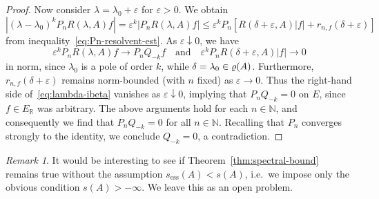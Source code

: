 \documentclass[a4paper, reqno]{amsart}
\numberwithin{equation}{section}
\theoremstyle{plain}
\theoremstyle{definition}
\theoremstyle{remark}
\newtheorem{remark}[theorem]{Remark}
\let\Re\relax
\DeclareMathOperator{\Re}{Re}
\newcommand{\NN}{\mathbb{N}}
\newcommand{\RR}{\mathbb{R}}
\begin{document}
\begin{proof}
	Now consider $\lambda=\lambda_0+\varepsilon$ for $\varepsilon >0$. We obtain
	\begin{equation}
		\label{eq:lambda-ibeta}
		|(\lambda-\lambda_0)^kP_n R(\lambda,A)f| = \varepsilon^k |P_n R(\lambda,A)f| \le \varepsilon^k P_n[R(\delta+\varepsilon,A)|f|+r_{n,f}(\delta+\varepsilon)]
	\end{equation}
	from inequality~\eqref{eq:Pn-resolvent-est}. As $\varepsilon\downarrow 0$, we have
	\begin{equation*}
		\varepsilon^k P_n R(\lambda,A)f \longrightarrow P_n Q_{-k}f \quad\text{and}\quad \varepsilon^k P_n R(\delta+\varepsilon,A)|f| \longrightarrow 0
	\end{equation*}
	in norm, since $\lambda_0$ is a pole of order $k$, while $\delta=\Re\lambda_0 \in\varrho(A)$. Furthermore, $r_{n,f}(\delta+\varepsilon)$ remains norm-bounded (with $n$ fixed) as $\varepsilon\to 0$. Thus the right-hand side of~\eqref{eq:lambda-ibeta} vanishes as $\varepsilon\downarrow 0$, implying that $P_n Q_{-k}=0$ on $E$, since $f\in E_\RR$ was arbitrary. The above arguments hold for each $n\in\NN$, and consequently we find that $P_n Q_{-k}=0$ for all $n\in\NN$. Recalling that $P_n$ converges strongly to the identity, we conclude $Q_{-k}=0$, a contradiction.
\end{proof}

\begin{remark}
	It would be interesting to see if Theorem~\ref{thm:spectral-bound} remains true without the assumption $s_{\mathrm{ess}}(A)<s(A)$, i.e.\ we impose only the obvious condition $s(A)>-\infty$. We leave this as an open problem.
\end{remark}
\end{document}
